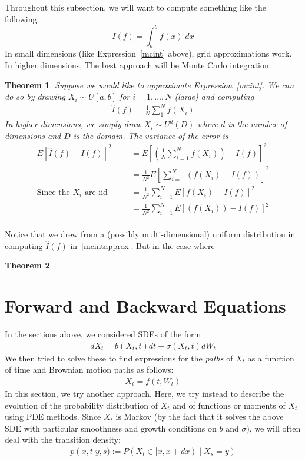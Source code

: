 \documentclass[12pt]{article}
\theoremstyle{plain}
\newtheorem{thm}{Theorem}[section]
\theoremstyle{definition}
\theoremstyle{remark}
\begin{document}
Throughout this subsection, we will want to compute something like the
following:
\begin{equation}
  I(f) = \int^b_a f(x) \; dx
  \label{mcint}
\end{equation}
In small dimensions (like Expression~\ref{mcint} above), grid
approximations work. In higher dimensions, The best approach will be
Monte Carlo integration.

\begin{thm}
Suppose we would like to approximate Expression~\ref{mcint}. We can do so by drawing $X_i \sim U[a,b]$ for $i=1,\ldots,N$ (large) and computing
\begin{align}
  \label{mcintapprox}
  \hat{I}(f) = \frac{1}{N} \sum^N_1 f(X_i)
\end{align}
In higher dimensions, we simply draw $X_i \sim U^d(D)$ where $d$ is the
number of dimensions and $D$ is the domain. The variance of the error is
\begin{align*}
  E[\hat{I}(f) - I(f)]^2
  &= E\left[ \left( \frac{1}{N}\sum^N_{i=1} f(X_i) \right)-I(f)\right]^2\\
  &= \frac{1}{N^2}E\left[ \sum^N_{i=1} \left(f(X_i)-I(f)\right)\right]^2\\
  \text{Since the $X_i$ are iid} \qquad
  &= \frac{1}{N^2}\sum^N_{i=1} E\left[ f(X_i)-I(f)\right]^2\\
  &= \frac{1}{N^2}\sum^N_{i=1} E\left[ \left( f(X_i) \right)- I(f)\right]^2\\
\end{align*}
\end{thm}

Notice that we drew from a (possibly multi-dimensional) uniform
distribution in computing $\hat{I}(f)$ in~\ref{mcintapprox}. But in the
case where

\begin{thm}
\end{thm}

\clearpage
\section{Forward and Backward Equations}

In the sections above, we considered SDEs of the form
\begin{align*}
  dX_t = b(X_t,t) dt + \sigma(X_t,t) dW_t
\end{align*}
We then tried to solve these to find expressions for the \emph{paths} of $X_t$ as a function of time and Brownian motion paths as follows:
\begin{align*}
  X_t = f(t,W_t)
\end{align*}
In this section, we try another approach. Here, we try instead to
describe the evolution of the probability distribution of $X_t$ and of
functions or moments of $X_t$ using PDE methods. Since $X_t$ is Markov
(by the fact that it solves the above SDE with particular smoothness and
growth conditions on $b$ and $\sigma$), we will often deal with the
transition density:
\begin{align*}
  p(x,t|y,s) := P(X_t\in [x,x+dx) \; | \; X_s=y)
\end{align*}
\end{document}
